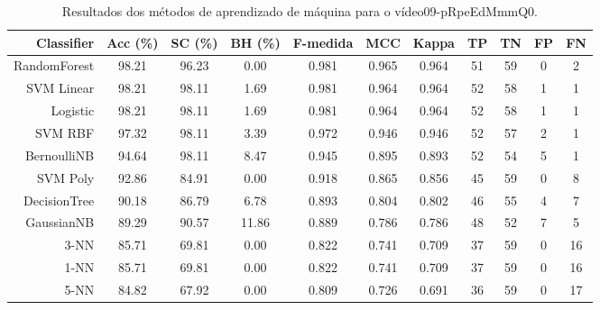 \begin{table}[!htb]
\centering
\caption{Resultados dos métodos de aprendizado de máquina para o vídeo09-pRpeEdMmmQ0.}
\label{tab:09-pRpeEdMmmQ0}
\begin{tabular}{r|c|c|c|c|c|c|c|c|c|c}
\hline\hline
Classifier & Acc (\%) & SC (\%) & BH (\%) & F-medida & MCC & Kappa & TP & TN & FP & FN \\ \hline
RandomForest & 98.21 & 96.23 & 0.00 & 0.981 & 0.965 & 0.964 & 51 & 59 & 0 & 2 \\ 
SVM Linear & 98.21 & 98.11 & 1.69 & 0.981 & 0.964 & 0.964 & 52 & 58 & 1 & 1 \\ 
Logistic & 98.21 & 98.11 & 1.69 & 0.981 & 0.964 & 0.964 & 52 & 58 & 1 & 1 \\ 
SVM RBF & 97.32 & 98.11 & 3.39 & 0.972 & 0.946 & 0.946 & 52 & 57 & 2 & 1 \\ 
BernoulliNB & 94.64 & 98.11 & 8.47 & 0.945 & 0.895 & 0.893 & 52 & 54 & 5 & 1 \\ 
SVM Poly & 92.86 & 84.91 & 0.00 & 0.918 & 0.865 & 0.856 & 45 & 59 & 0 & 8 \\ 
DecisionTree & 90.18 & 86.79 & 6.78 & 0.893 & 0.804 & 0.802 & 46 & 55 & 4 & 7 \\ 
GaussianNB & 89.29 & 90.57 & 11.86 & 0.889 & 0.786 & 0.786 & 48 & 52 & 7 & 5 \\ 
3-NN & 85.71 & 69.81 & 0.00 & 0.822 & 0.741 & 0.709 & 37 & 59 & 0 & 16 \\ 
1-NN & 85.71 & 69.81 & 0.00 & 0.822 & 0.741 & 0.709 & 37 & 59 & 0 & 16 \\ 
5-NN & 84.82 & 67.92 & 0.00 & 0.809 & 0.726 & 0.691 & 36 & 59 & 0 & 17 \\ 
\hline\hline
\end{tabular}
\end{table}

